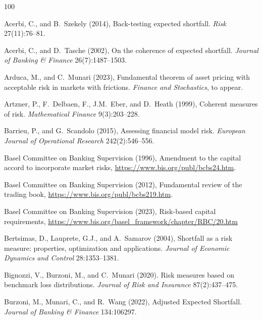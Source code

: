 \documentclass[12pt]{article}
\theoremstyle{plain}
\theoremstyle{definition}
\theoremstyle{remark}
\numberwithin{equation}{section}
\begin{document}

\begin{thebibliography}{100}

{\small


 Acerbi, C., and B.\ Szekely (2014), Back-testing expected shortfall. {\em Risk} 27(11):76--81.

 Acerbi, C., and D.\ Tasche (2002), On the coherence of expected shortfall. \textit{Journal of Banking \& Finance} 26(7):1487--1503.

 Arduca, M., and C.\ Munari (2023), Fundamental theorem of asset pricing with acceptable risk in markets with frictions. \textit{Finance and Stochastics}, to appear.

 Artzner, P., F.\ Delbaen, F., J.M.\ Eber, and D.\ Heath (1999), Coherent measures of risk. {\em Mathematical Finance} 9(3):203--228.

 Barrieu, P., and G.\ Scandolo (2015), Assessing financial model risk. {\em European Journal of Operational Research} 242(2):546--556.

 Basel Committee on Banking Supervision (1996), Amendment to the capital accord to incorporate market risks, \url{https://www.bis.org/publ/bcbs24.htm}.

 Basel Committee on Banking Supervision (2012), Fundamental review of the trading book, \url{https://www.bis.org/publ/bcbs219.htm}.

 Basel Committee on Banking Supervision (2023), Risk-based capital requirements, \url{https://www.bis.org/basel_framework/chapter/RBC/20.htm}

 Bertsimas, D., Lauprete, G.J., and A.\ Samarov (2004), Shortfall as a risk measure: properties, optimization and applications. {\em Journal of Economic Dynamics and Control} 28:1353--1381.

 Bignozzi, V., Burzoni, M., and C.\ Munari (2020). Risk measures based on benchmark loss distributions. {\em Journal of Risk and Insurance} 87(2):437--475.

 Burzoni, M., Munari, C., and R.\ Wang (2022), Adjusted Expected Shortfall. {\em Journal of Banking \& Finance} 134:106297.

}
\end{thebibliography}
\end{document}
